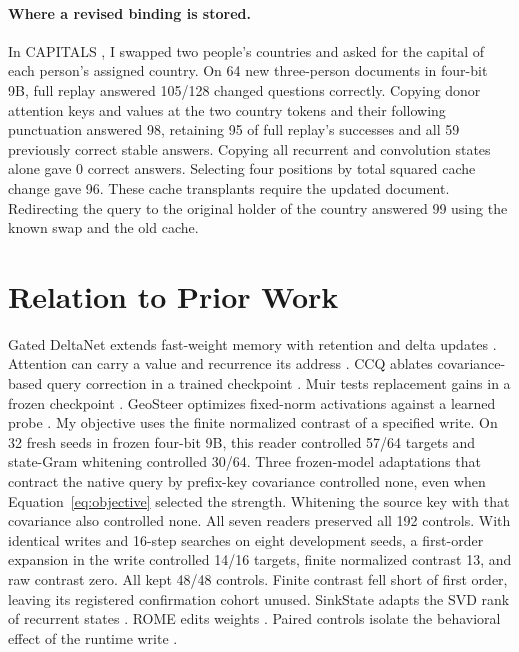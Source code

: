 \documentclass[letterpaper]{article}
\begin{document}
\paragraph{Where a revised binding is stored.}
In CAPITALS \citep{feng2024}, I swapped two people's countries and
asked for the capital of each person's assigned country. On 64 new three-person documents in
four-bit 9B, full replay answered 105/128 changed questions correctly.
Copying donor attention keys and values at the two country tokens
and their following punctuation answered 98, retaining 95 of full replay's
successes and all 59 previously correct stable answers. Copying all
recurrent and convolution states alone gave 0 correct answers. Selecting
four positions by total squared cache change gave 96. These cache transplants \citep{loos2026} require the updated document. Redirecting the query to the
original holder of the country answered 99 using the known swap and the old cache.

\section{Relation to Prior Work}
Gated DeltaNet extends fast-weight memory with retention and delta updates \citep{schlag2021,yang2025}. Attention can carry a value \citep{afendulev2026,lee2026} and recurrence its address \citep{zeng2026}.
CCQ ablates covariance-based query correction in a trained checkpoint \citep{le2026}. Muir tests replacement gains in a frozen checkpoint \citep{gangavarapu2026}. GeoSteer optimizes fixed-norm activations against a learned probe \citep{ngo2026}. My objective uses the finite normalized contrast of a specified write. On 32 fresh seeds in frozen four-bit 9B, this reader
controlled 57/64 targets and state-Gram whitening controlled 30/64.
Three frozen-model adaptations that contract the native query by prefix-key covariance
controlled none, even when Equation~\ref{eq:objective} selected the
strength. Whitening the source key with that covariance also controlled
none. All seven readers preserved all 192 controls.
With identical writes and 16-step searches on eight development seeds, a first-order expansion in the write controlled 14/16 targets, finite normalized contrast 13, and raw contrast zero. All kept 48/48 controls. Finite contrast fell short of first order, leaving its registered confirmation cohort unused.
SinkState adapts the SVD rank of recurrent states \citep{jiang2026}.
ROME edits weights \citep{meng2022}. Paired controls isolate the
behavioral effect of the runtime write \citep{zhang2024}.
\end{document}
